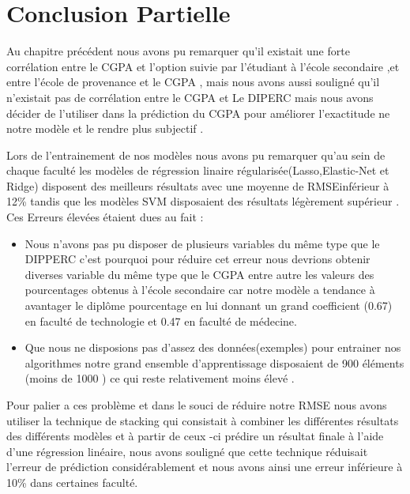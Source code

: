\section{Conclusion Partielle }
Au chapitre précédent nous avons pu remarquer qu'il existait une forte corrélation entre le CGPA et l'option suivie par l'étudiant à l'école secondaire ,et entre l'école de provenance et le CGPA , mais nous avons aussi souligné qu'il n'existait pas de corrélation entre le CGPA et Le DIPERC mais nous avons décider de l'utiliser dans la prédiction du CGPA pour améliorer l'exactitude ne notre modèle et le rendre plus subjectif  .

Lors de l'entrainement de nos modèles nous avons pu remarquer qu'au sein de chaque faculté les modèles de régression linaire régularisée(Lasso,Elastic-Net et Ridge) disposent des meilleurs résultats avec une moyenne de \ac{RMSE}inférieur à 12\% tandis que les modèles SVM disposaient des résultats légèrement supérieur .
Ces Erreurs élevées étaient dues au fait :

\begin{itemize}
	\item Nous n'avons pas pu disposer de plusieurs variables du même type que le DIPPERC  c'est pourquoi pour réduire cet erreur nous devrions obtenir diverses variable du même type que le CGPA entre autre les valeurs des pourcentages obtenus à l'école secondaire car notre modèle a tendance à avantager le diplôme pourcentage en lui donnant un grand coefficient (0.67) en faculté de technologie et 0.47 en faculté de médecine. 
	\item Que nous ne disposions pas d'assez des données(exemples) pour entrainer nos algorithmes notre grand ensemble d'apprentissage disposaient de 900 éléments (moins de 1000 ) ce qui reste relativement  moins élevé   .
\end{itemize}

Pour palier a ces problème et dans le souci de réduire notre \ac{RMSE} nous avons utiliser la technique de stacking qui consistait à combiner les différentes résultats des différents modèles et à partir de ceux -ci prédire un résultat finale à l'aide d'une régression linéaire, nous avons souligné que cette technique réduisait l'erreur de prédiction considérablement et nous avons ainsi une erreur inférieure à 10\% dans certaines faculté.

